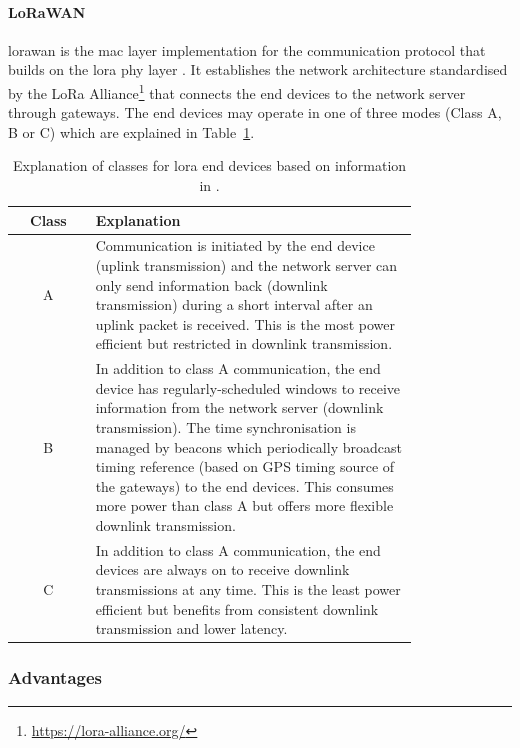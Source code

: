\paragraph{LoRaWAN} \gls{lorawan} is the \gls{mac} layer implementation for the communication protocol that builds on the \gls{lora} \gls{phy} layer \cite{semtech2024lora}. It establishes the network architecture standardised by the LoRa Alliance\footnote{\url{https://lora-alliance.org/}} that connects the end devices to the network server through gateways. The end devices may operate in one of three modes (Class A, B or C) which are explained in Table~\ref{tab:euc_loraclasses}. 

\begin{table}[h!]
    \centering
    \begin{tabular}{|c|p{0.8\linewidth}|}
    \hline
        \textbf{Class} & \textbf{Explanation} \\
    \hline\hline
        A & Communication is initiated by the end device (uplink transmission) and the network server can only send information back (downlink transmission) during a short interval after an uplink packet is received. This is the most power efficient but restricted in downlink transmission. \\
    \hline
        B & In addition to class A communication, the end device has regularly-scheduled windows to receive information from the network server (downlink transmission). The time synchronisation is managed by beacons which periodically broadcast timing reference (based on GPS timing source of the gateways) to the end devices. This consumes more power than class A but offers more flexible downlink transmission. \\
    \hline
        C & In addition to class A communication, the end devices are always on to receive downlink transmissions at any time. This is the least power efficient but benefits from consistent downlink transmission and lower latency. \\
    \hline
    \end{tabular}
    \caption[Explanation of Classes for LoRa End Devices]
    {Explanation of classes for \gls{lora} end devices based on information in \cite{semtech2024lora}.}
    \label{tab:euc_loraclasses}
\end{table}

\subsubsection{Advantages}

